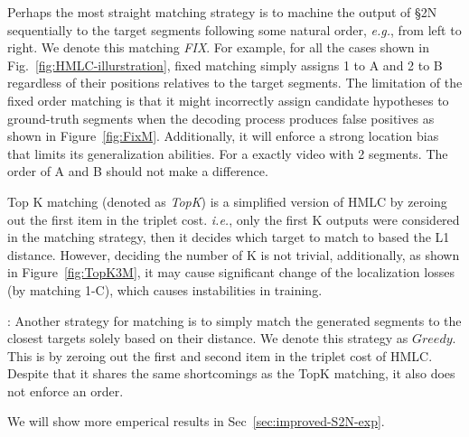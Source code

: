 \documentclass[10pt,journal,compsoc]{IEEEtran}
\begin{document}
  Perhaps the most straight matching strategy is to machine the output of \S2N sequentially to the target segments following some natural order, \emph{e.g.}, from left to right. We denote this matching \emph{FIX}. For example, for all the cases shown in Fig.~\ref{fig:HMLC-illurstration}, fixed matching simply assigns 1 to A and 2 to B regardless of their positions relatives to the target segments.  The limitation of the fixed order matching is that it might incorrectly assign candidate hypotheses to ground-truth segments when the decoding process produces false positives as shown in Figure~\ref{fig:FixM}. Additionally, it will enforce a strong location bias that limits its generalization abilities. For a exactly video with 2 segments. The order of A and B should not make a difference.
 
 

 
 
 Top K matching (denoted as \emph{TopK}) is a simplified version of HMLC by zeroing out the first item in the triplet cost. \emph{i.e.},  only the first K outputs were considered in the matching strategy, then it decides  which target to match to based the L1 distance.  However, deciding the number of K is not trivial, additionally, as shown in Figure~\ref{fig:TopK3M}, it may cause significant change of the localization losses (by matching  1-C), which causes instabilities in training.

: Another strategy for matching is to simply match the generated segments to the closest targets solely based on their distance. We denote this strategy as $Greedy$. This is by zeroing out the first and second item in the triplet cost of HMLC. Despite that it shares the same shortcomings as the TopK matching, it also does not enforce an order.


We will show more emperical results in Sec~\ref{sec:improved-S2N-exp}.  


\end{document}
